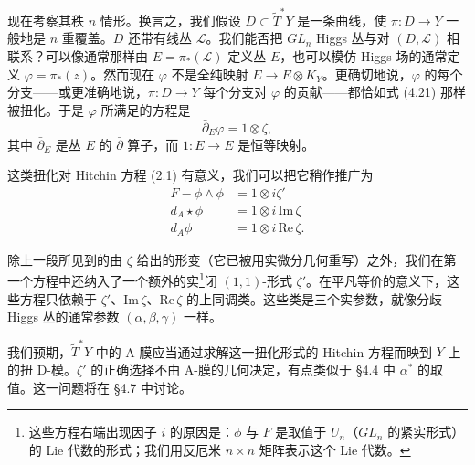 
现在考察其秩 $n$ 情形。换言之，我们假设 $D\subset\widetilde{T}^*Y$ 是一条曲线，使 $\pi:D\to Y$ 一般地是 $n$ 重覆盖。$D$ 还带有线丛 $\mathcal{L}$。我们能否把 $GL_n$ Higgs 丛与对 $(D,\mathcal{L})$ 相联系？可以像通常那样由 $E=\pi_*(\mathcal{L})$ 定义丛 $E$，也可以模仿 Higgs 场的通常定义 $\varphi=\pi_*(z)$。然而现在 $\varphi$ 不是全纯映射
$E\to E\otimes K_Y$。更确切地说，$\varphi$ 的每个分支——或更准确地说，$\pi:D\to Y$ 每个分支对 $\varphi$ 的贡献——都恰如式 (4.21) 那样被扭化。于是 $\varphi$ 所满足的方程是
\begin{equation}\tag{4.22}
\bar\partial_E\varphi=1\otimes\zeta,
\end{equation}
其中 $\bar\partial_E$ 是丛 $E$ 的 $\bar\partial$ 算子，而 $1:E\to E$ 是恒等映射。

这类扭化对 Hitchin 方程 (2.1) 有意义，我们可以把它稍作推广为
\begin{equation}\tag{4.23}
\begin{aligned}
F-\phi\wedge\phi&=1\otimes i\zeta'\\
d_A\star\phi&=1\otimes i\,\mathrm{Im}\,\zeta\\
d_A\phi&=1\otimes i\,\mathrm{Re}\,\zeta.
\end{aligned}
\end{equation}

除上一段所见到的由 $\zeta$ 给出的形变（它已被用实微分几何重写）之外，我们在第一个方程中还纳入了一个额外的实\footnote{这些方程右端出现因子 $i$ 的原因是：$\phi$ 与 $F$ 是取值于 $U_n$（$GL_n$ 的紧实形式）的 Lie 代数的形式；我们用反厄米 $n\times n$ 矩阵表示这个 Lie 代数。}闭 $(1,1)$-形式 $\zeta'$。在平凡等价的意义下，这些方程只依赖于 $\zeta'$、$\mathrm{Im}\,\zeta$、$\mathrm{Re}\,\zeta$ 的上同调类。这些类是三个实参数，就像分歧 Higgs 丛的通常参数 $(\alpha,\beta,\gamma)$ 一样。

我们预期，$\widetilde{T}^*Y$ 中的 A-膜应当通过求解这一扭化形式的 Hitchin 方程而映到 $Y$ 上的扭 D-模。$\zeta'$ 的正确选择不由 A-膜的几何决定，有点类似于 §4.4 中 $\alpha^*$ 的取值。这一问题将在 §4.7 中讨论。

